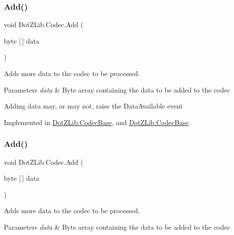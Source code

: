 \subsubsection{\texorpdfstring{Add()}{Add()}\hspace{0.1cm}{\footnotesize\ttfamily [1/4]}}
{\footnotesize\ttfamily void Dot\+Z\+Lib.\+Codec.\+Add (\begin{DoxyParamCaption}\item[{byte \mbox{[}$\,$\mbox{]}}]{data }\end{DoxyParamCaption})}



Adds more data to the codec to be processed. 


\begin{DoxyParams}{Parameters}
{\em data} & Byte array containing the data to be added to the codec\\
\hline
\end{DoxyParams}


Adding data may, or may not, raise the {\ttfamily Data\+Available} event

Implemented in \hyperlink{class_dot_z_lib_1_1_codec_base_a9131ff23312ada67dbf58f428d562de4}{Dot\+Z\+Lib.\+Codec\+Base}, and \hyperlink{class_dot_z_lib_1_1_codec_base_a9131ff23312ada67dbf58f428d562de4}{Dot\+Z\+Lib.\+Codec\+Base}.

\mbox{\label{interface_dot_z_lib_1_1_codec_aa40d0820bd95f098b3e7d8e707e7a536}} 
\subsubsection{\texorpdfstring{Add()}{Add()}\hspace{0.1cm}{\footnotesize\ttfamily [2/4]}}
{\footnotesize\ttfamily void Dot\+Z\+Lib.\+Codec.\+Add (\begin{DoxyParamCaption}\item[{byte \mbox{[}$\,$\mbox{]}}]{data }\end{DoxyParamCaption})}



Adds more data to the codec to be processed. 


\begin{DoxyParams}{Parameters}
{\em data} & Byte array containing the data to be added to the codec\\
\hline
\end{DoxyParams}


